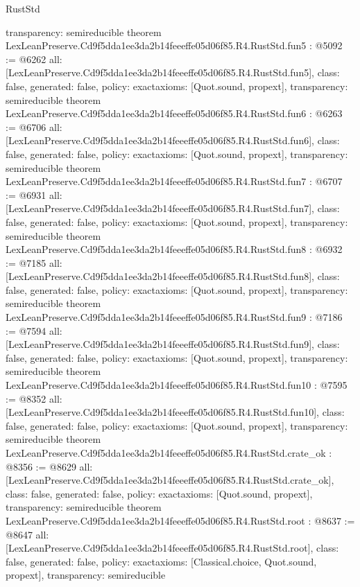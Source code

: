 \begin{lexlean}{RustStd}
\begin{coremodule}
{  transparency: semireducible
}
theorem LexLeanPreserve.Cd9f5dda1ee3da2b14feeeffe05d06f85.R4.RustStd.fun5 : @5092 := @6262 {
  all: [LexLeanPreserve.Cd9f5dda1ee3da2b14feeeffe05d06f85.R4.RustStd.fun5],
  class: false,
  generated: false,
  policy: exact{axioms: [Quot.sound, propext]},
  transparency: semireducible
}
theorem LexLeanPreserve.Cd9f5dda1ee3da2b14feeeffe05d06f85.R4.RustStd.fun6 : @6263 := @6706 {
  all: [LexLeanPreserve.Cd9f5dda1ee3da2b14feeeffe05d06f85.R4.RustStd.fun6],
  class: false,
  generated: false,
  policy: exact{axioms: [Quot.sound, propext]},
  transparency: semireducible
}
theorem LexLeanPreserve.Cd9f5dda1ee3da2b14feeeffe05d06f85.R4.RustStd.fun7 : @6707 := @6931 {
  all: [LexLeanPreserve.Cd9f5dda1ee3da2b14feeeffe05d06f85.R4.RustStd.fun7],
  class: false,
  generated: false,
  policy: exact{axioms: [Quot.sound, propext]},
  transparency: semireducible
}
theorem LexLeanPreserve.Cd9f5dda1ee3da2b14feeeffe05d06f85.R4.RustStd.fun8 : @6932 := @7185 {
  all: [LexLeanPreserve.Cd9f5dda1ee3da2b14feeeffe05d06f85.R4.RustStd.fun8],
  class: false,
  generated: false,
  policy: exact{axioms: [Quot.sound, propext]},
  transparency: semireducible
}
theorem LexLeanPreserve.Cd9f5dda1ee3da2b14feeeffe05d06f85.R4.RustStd.fun9 : @7186 := @7594 {
  all: [LexLeanPreserve.Cd9f5dda1ee3da2b14feeeffe05d06f85.R4.RustStd.fun9],
  class: false,
  generated: false,
  policy: exact{axioms: [Quot.sound, propext]},
  transparency: semireducible
}
theorem LexLeanPreserve.Cd9f5dda1ee3da2b14feeeffe05d06f85.R4.RustStd.fun10 : @7595 := @8352 {
  all: [LexLeanPreserve.Cd9f5dda1ee3da2b14feeeffe05d06f85.R4.RustStd.fun10],
  class: false,
  generated: false,
  policy: exact{axioms: [Quot.sound, propext]},
  transparency: semireducible
}
theorem LexLeanPreserve.Cd9f5dda1ee3da2b14feeeffe05d06f85.R4.RustStd.crate_ok : @8356 := @8629 {
  all: [LexLeanPreserve.Cd9f5dda1ee3da2b14feeeffe05d06f85.R4.RustStd.crate_ok],
  class: false,
  generated: false,
  policy: exact{axioms: [Quot.sound, propext]},
  transparency: semireducible
}
theorem LexLeanPreserve.Cd9f5dda1ee3da2b14feeeffe05d06f85.R4.RustStd.root : @8637 := @8647 {
  all: [LexLeanPreserve.Cd9f5dda1ee3da2b14feeeffe05d06f85.R4.RustStd.root],
  class: false,
  generated: false,
  policy: exact{axioms: [Classical.choice, Quot.sound, propext]},
  transparency: semireducible
}


\end{coremodule}
\end{lexlean}

